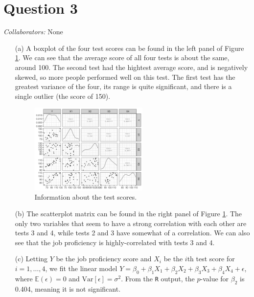 \documentclass[10pt]{article}
\newcommand{\mycolaba}[1]{\textcolor{colabcol}{\textsl{Collaborators:}} #1}
\begin{document}
\section{Question 3} \noindent
\mycolaba{None}
\begin{itemize}
    \item[(a)] A boxplot of the four test scores can be found in the left panel of Figure \ref{q03-info}. We can see that the average score of all four tests is 
    about the same, around 100. The second test had the hightest average score, and is negatively skewed, so more people performed well on this test. 
    The first test has the greatest variance of the four, its range is quite significant, and there is a single outlier (the score of 150). 
    \begin{figure}[ht]
        \centering
        \includegraphics[width = 0.55\textwidth]{img/q03-correlation-matrix.png}
        \caption{Information about the test scores. }
        \label{q03-info}
    \end{figure}

    \item[(b)] The scatterplot matrix can be found in the right panel of Figure \ref{q03-info}. The only two variables that seem to have a strong correlation 
    with each other are tests 3 and 4, while tests 2 and 3 have somewhat of a correlation. We can also see that the job proficiency is highly-correlated with 
    tests 3 and 4. 

    \item[(c)] Letting \(Y\) be the job proficiency score and \(X_i\) be the \(i\)th test score for \(i = 1, \ldots, 4\), we fit the linear model 
    \(Y = \beta_0 + \beta_1 X_1 + \beta_2 X_2 + \beta_3 X_3 + \beta_4 X_4 + \epsilon\), where \(\mathbb{E}(\epsilon) = 0\) and \(\mathrm{Var}[\epsilon] = \sigma^2\).
    From the \texttt{R} output, the \(p\)-value for \(\beta_2\) is 0.404, meaning it is not significant. 
\end{itemize}
\end{document}
